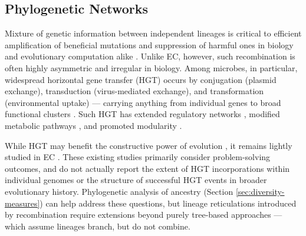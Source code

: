 \subsection{Phylogenetic Networks}
\label{sec:recombination}

Mixture of genetic information between independent lineages is critical to efficient amplification of beneficial mutations and suppression of harmful ones in biology and evolutionary computation alike \citep{felsenstein1976evolutionary,holland1975adaptation}.
Unlike EC, however, such recombination is often highly asymmetric and irregular in biology.
Among microbes, in particular, widespread horizontal gene transfer (HGT) occurs by conjugation (plasmid exchange), transduction (virus-mediated exchange), and transformation (environmental uptake) \citep{arnold2022horizontal} --- carrying anything from individual genes to broad functional clusters \citep{brinkmann2018horizontal,martin2018physiological}.
Such HGT has extended regulatory networks \citep{price2008horizontal}, modified metabolic pathways \citep{goyal2022horizontal}, and promoted modularity \citep{kreimer2008evolution}.

While HGT may benefit the constructive power of evolution \citep{wiser2019horizontal}, it remains lightly studied in EC \citep{goldbarg2009transgeneic,peralesgravan2008am,harvey2011microbial,mehrafsa2013high,tomko2013unconstrain,atkinson2020horizontal}.
These existing studies primarily consider problem-solving outcomes, and do not actually report the extent of HGT incorporations within individual genomes or the structure of successful HGT events in broader evolutionary history.
Phylogenetic analysis of ancestry (Section \ref{sec:diversity-measures}) can help address these questions, but lineage reticulations introduced by recombination require extensions beyond purely tree-based approaches --- which assume lineages branch, but do not combine.

